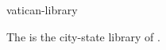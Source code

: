 \documentclass{stex}
\begin{document}
\begin{smodule}{vatican-library}
\begin{sparagraph}[style=symdoc]
The  is the city-state library of .
\end{sparagraph}
\end{smodule}
\end{document}
